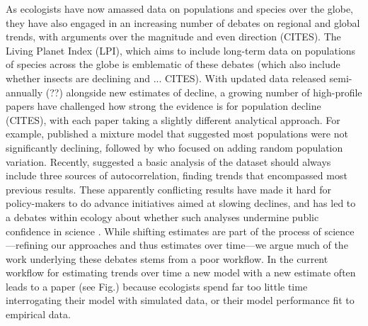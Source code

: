 \documentclass[11pt]{article}
\begin{document}
As ecologists have now amassed data on populations and species over the globe, they have also engaged in an increasing number of debates on regional and global trends, with arguments over the magnitude and even direction (CITES). The Living Planet Index (LPI), which aims to include long-term data on populations of species across the globe is emblematic of these debates (which also include whether insects are declining and ... CITES). With updated data released semi-annually (??) alongside new estimates of decline, a growing number of high-profile papers have challenged how strong the evidence is for population decline (CITES), with each paper taking a slightly different analytical approach. For example, \citet{Leung2020} published a mixture model that suggested most populations were not significantly declining, followed by \citet{Buschke2021} who focused on adding random population variation. Recently, \citep{Johnson2024} suggested a basic analysis of the dataset should always include three sources of autocorrelation, finding trends that encompassed most previous results. These apparently conflicting results have made it hard for policy-makers to do advance initiatives aimed at slowing declines, and has led to a debates within ecology about whether such analyses undermine public confidence in science  \citep{gonzalez2016estimating}. While shifting estimates are part of the process of science---refining our approaches and thus estimates over time---we argue much of the work underlying these debates stems from a poor workflow. In the current workflow for estimating trends over time a new model with a new estimate often leads to a paper (see Fig.) because ecologists spend far too little time interrogating their model with simulated data, or their model performance fit to empirical data. 
\end{document}
